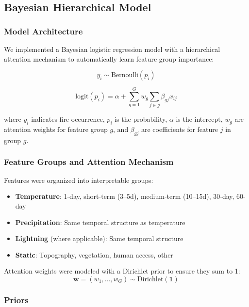 \documentclass[11pt,a4paper]{article}
\begin{document}
\subsection{Bayesian Hierarchical Model}

\subsubsection{Model Architecture}

We implemented a Bayesian logistic regression model with a hierarchical attention mechanism to automatically learn feature group importance:

\begin{equation}
y_i \sim \text{Bernoulli}(p_i)
\end{equation}

\begin{equation}
\text{logit}(p_i) = \alpha + \sum_{g=1}^{G} w_g \sum_{j \in g} \beta_{gj} x_{ij}
\end{equation}

where $y_i$ indicates fire occurrence, $p_i$ is the probability, $\alpha$ is the intercept, $w_g$ are attention weights for feature group $g$, and $\beta_{gj}$ are coefficients for feature $j$ in group $g$.

\subsubsection{Feature Groups and Attention Mechanism}

Features were organized into interpretable groups:
\begin{itemize}
    \item \textbf{Temperature}: 1-day, short-term (3--5d), medium-term (10--15d), 30-day, 60-day
    \item \textbf{Precipitation}: Same temporal structure as temperature
    \item \textbf{Lightning} (where applicable): Same temporal structure
    \item \textbf{Static}: Topography, vegetation, human access, other
\end{itemize}

Attention weights were modeled with a Dirichlet prior to ensure they sum to 1:
\begin{equation}
\mathbf{w} = (w_1, ..., w_G) \sim \text{Dirichlet}(\mathbf{1})
\end{equation}

\subsubsection{Priors}
\end{document}

